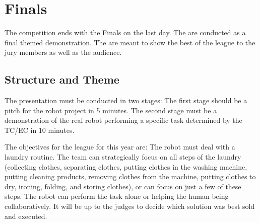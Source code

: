 \chapter{Finals}
\label{chap:finals}

The competition ends with the Finals on the last day.
The  are conducted as a final themed demonstration.
The  are meant to show the best of the league to the jury members as well as the audience.

\section{Structure and Theme}


The presentation must be conducted in two stages:
The first stage should be a pitch for the robot project in 5 minutes. 
The second stage must be a demonstration of the real robot performing a specific task determined by the TC/EC in 10 minutes.

The objectives for the league for this year are:
The robot must deal with a laundry routine. The team can strategically focus on all steps of the laundry (collecting clothes, separating clothes, putting clothes in the washing machine, putting cleaning products, removing clothes from the machine, putting clothes to dry, ironing, folding, and storing clothes), or can focus on just a few of these steps. The robot can perform the task alone or helping the human being collaboratively. It will be up to the judges to decide which solution was best sold and executed.



